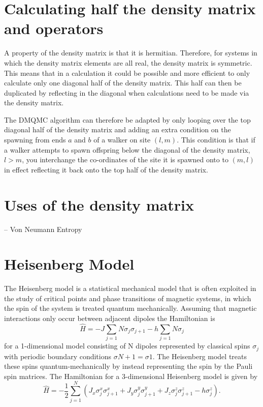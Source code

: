 \documentclass[12pt,a4paper]{article}
\begin{document}
\section{Calculating half the density matrix and operators}
A property of the density matrix is that it is hermitian. Therefore, for systems in which the density matrix elements are all real, the density matrix is symmetric. This means that in a calculation it could be possible and more efficient to only calculate only one diagonal half of the density matrix. This half can then be duplicated by reflecting in the diagonal when calculations need to be made via the density matrix.

The DMQMC algorithm can therefore be adapted by only looping over the top diagonal half of the density matrix and adding an extra condition on the spawning from ends $a$ and $b$ of a walker on site $(l,m)$. This condition is that if a walker attempts to spawn offspring below the diagonal of the density matrix, $l>m$, you interchange the co-ordinates of the site it is spawned onto to $(m,l)$ in effect reflecting it back onto the top half of the density matrix.

\section{Uses of the density matrix}
-- Von Neumann Entropy
\section{Heisenberg Model}
The Heisenberg model is a statistical mechanical model that is often exploited in the study of critical points and phase transitions of magnetic systems, in which the spin of the system is treated quantum mechanically. Assuming that magnetic interactions only occur between adjacent dipoles the Hamiltonian is
\begin{equation}
\hat{H} = -J\sum_{j=1}{N}\sigma_j\sigma_{j+1}-h\sum_{j=1}{N}\sigma_j
\label{eq:classicalSpinHamiltonian}
\end{equation}
for a 1-dimensional model consisting of N dipoles represented by classical spins $\sigma_j$ with periodic boundary conditions $\sigma{N+1}=\sigma{1}$. The Heisenberg model treats these spins quantum-mechanically by instead representing the spin by the Pauli spin matrices. The Hamiltonian for a 3-dimensional Heisenberg model is given by
\begin{equation}
\label{3dHeisenburgHamiltonian}
\hat{H}=-\frac{1}{2}\sum_{j=1}^{N}\left(J_x\sigma^x_j\sigma^x_{j+1}+J_y\sigma^y_j\sigma^y_{j+1}+J_z\sigma^z_j\sigma^z_{j+1}-h\sigma^z_j\right).
\end{equation}
\end{document}

